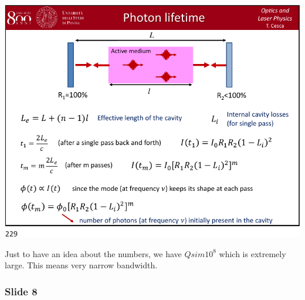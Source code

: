 \documentclass[../main/main.tex]{subfiles}
\begin{document}
\begin{minipage}[]{0.5\linewidth}
\centering
\includegraphics[page=7,width=1\textwidth]{../lessons/pdf_file/12_lecture.pdf}
\end{minipage}
\hspace{0.3cm}\vspace{0.3cm}
\begin{minipage}[c]{0.47\linewidth}

Just to have an idea about the numbers, we have \( Q sim 10^8\) which is extremely large. This means very narrow bandwidth.

\end{minipage}

\subsubsection*{Slide 8}
\end{document}
